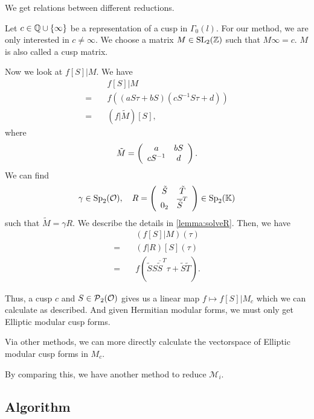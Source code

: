 We get relations between different reductions.

Let $c \in \Q \cup \Set{\infty}$ be a representation of a cusp in $\Gamma_0(l)$. For our method, we are only interested in $c \ne \infty$. We choose a matrix $M \in \operatorname{SL}_2(\mathbb{Z})$ such that $M \infty = c$. $M$ is also called a cusp matrix.

Now we look at $f[S] | M$. We have
\begin{align*}
& f[S] | M \\
=\quad & f( (a S \tau + b S) ( c S^{-1} S \tau + d) ) \\
=\quad & ( f | \tilde{M} )[S] ,
\end{align*}
where
\[ \tilde{M} = \left( \begin{array}{cc} a & bS \\ cS^{-1} & d \end{array} \right) . \]
%
We can find
\[ \gamma \in \operatorname{Sp}_2(\mathcal{O}), \quad R = \left( \begin{array}{cc} \tilde{S} & \tilde{T} \\ 0_2 & \overline{\tilde{S}}^T \end{array} \right) \in \operatorname{Sp}_2(\mathbb{K}) \]
such that $\tilde{M} = \gamma R$. We describe the details in \cref{lemma:solveR}.
Then, we have
\begin{align*}
& (f[S] | M) (\tau) \\
=\quad& (f | R) [S] (\tau) \\
=\quad& f( \tilde{S} S \overline{\tilde{S}}^T \tau + \tilde{S} \tilde{T} ) .
\end{align*}

Thus, a cusp $c$ and $S \in \operatorname{\mathcal{P}}_2(\mathcal{O})$ gives us a linear map $f \mapsto f[S] | M_c$ which we can calculate as described. %
And given Hermitian modular forms, we must only get Elliptic modular cusp forms.

Via other methods, we can more directly calculate the vectorspace of Elliptic modular cusp forms in $M_c$.

By comparing this, we have another method to reduce $\mathcal{M}_i$.

\begin{lemma}
\label{lemma:solveR}
\end{lemma}

\subsection{Algorithm}

